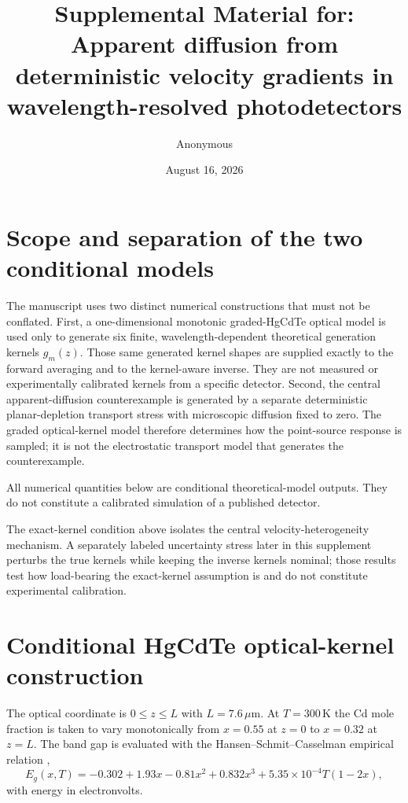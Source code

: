 \documentclass[aps,pra,onecolumn,superscriptaddress,nofootinbib]{revtex4-2}
\begin{document}
\title{Supplemental Material for: Apparent diffusion from deterministic velocity gradients in wavelength-resolved photodetectors}
\author{Anonymous}
\date{August 16, 2026}
\maketitle

\section{Scope and separation of the two conditional models}

The manuscript uses two distinct numerical constructions that must not be conflated.  First, a one-dimensional monotonic graded-HgCdTe optical model is used only to generate six finite, wavelength-dependent theoretical generation kernels $g_m(z)$.  Those same generated kernel shapes are supplied exactly to the forward averaging and to the kernel-aware inverse.  They are not measured or experimentally calibrated kernels from a specific detector.  Second, the central apparent-diffusion counterexample is generated by a separate deterministic planar-depletion transport stress with microscopic diffusion fixed to zero.  The graded optical-kernel model therefore determines how the point-source response is sampled; it is not the electrostatic transport model that generates the counterexample.

All numerical quantities below are conditional theoretical-model outputs.  They do not constitute a calibrated simulation of a published detector.

The exact-kernel condition above isolates the central velocity-heterogeneity mechanism. A separately labeled uncertainty stress later in this supplement perturbs the true kernels while keeping the inverse kernels nominal; those results test how load-bearing the exact-kernel assumption is and do not constitute experimental calibration.


\section{Conditional HgCdTe optical-kernel construction}

The optical coordinate is $0\le z\le L$ with $L=7.6\,\mu\mathrm{m}$.  At $T=300\,\mathrm{K}$ the Cd mole fraction is taken to vary monotonically from $x=0.55$ at $z=0$ to $x=0.32$ at $z=L$.  The band gap is evaluated with the Hansen--Schmit--Casselman empirical relation \cite{hansen1982gap},
\begin{equation}
E_g(x,T)=-0.302+1.93x-0.81x^2+0.832x^3+5.35\times10^{-4}T(1-2x),
\end{equation}
with energy in electronvolts.
\end{document}
